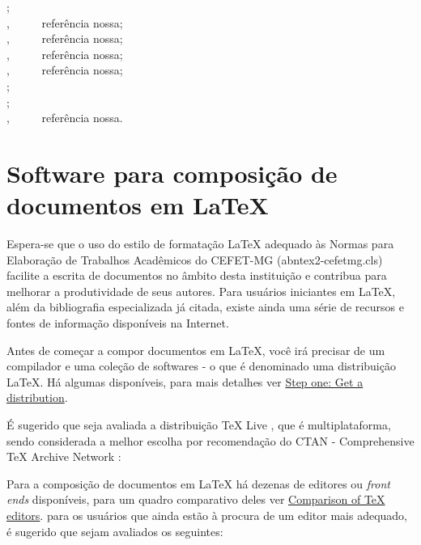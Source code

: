 \begin{apendicesenv}
{	\cite{souza1985} ;\\
	\cite{TeX-Br2014} , \ \ \ \ \ referência nossa;\\
	\cite{TeXLive2014} , \ \ \ \ \ referência nossa;\\
	\cite{TeXnicCenter2014} , \ \ \ \ \ referência nossa;\\
	\cite{TeXstudio2014} , \ \ \ \ \ referência nossa;\\
	\cite{vaso1999} ;\\
	\cite{villa1916} ;\\
	\cite{Wikibooks2014} , \ \ \ \ \ referência nossa.\\
}





\chapter{Software para composição de documentos em \LaTeX}
\label{chap:softApoio}

Espera-se que o uso do estilo de formatação \LaTeX{} adequado às Normas para Elaboração de Trabalhos Acadêmicos do CEFET-MG ({\ttfamily abntex2-cefetmg.cls}) facilite a escrita de documentos no âmbito desta instituição e contribua para melhorar a produtividade de seus autores. Para usuários iniciantes em \LaTeX{}, além da bibliografia especializada já citada, existe ainda uma série de recursos \cite{CTAN2014} e fontes de informação \cite{TeX-Br2014,Wikibooks2014} disponíveis na Internet.

Antes de começar a compor documentos em \LaTeX{}, você irá precisar de um compilador e uma coleção de softwares - o que é denominado uma distribuição \LaTeX{}. Há algumas disponíveis, para mais detalhes ver \href{http://www.ctan.org/starter.html}{Step one: Get a distribution}.

É sugerido que seja avaliada a distribuição TeX Live \cite{TeXLive2014}, que é multiplataforma, sendo considerada a melhor escolha por recomendação do CTAN - Comprehensive \TeX{} Archive Network \cite{CTAN2014}:

Para a composição de documentos em \LaTeX{} há dezenas de editores ou \textit{front ends} disponíveis, para um quadro comparativo deles ver \href{http://en.wikipedia.org/wiki/Comparison_of_TeX_editors}{Comparison of TeX editors}. para os usuários que ainda estão à procura de um editor mais adequado, é sugerido que sejam avaliados os seguintes:


\end{apendicesenv}
